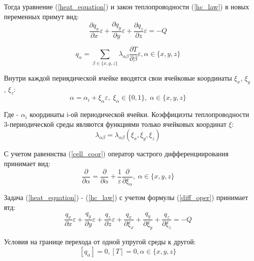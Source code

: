 Тогда уравнение 
(\ref{heat_equation}) 
и закон теплопроводности 
(\ref{hc_law}) 
в новых переменных примут вид:
\begin{equation}
    \frac{\partial q_x}{\partial x}\varepsilon + \frac{\partial q_y}{\partial y}\varepsilon + \frac{\partial q_z}{\partial z}\varepsilon = -Q
\end{equation}

\begin{equation}
    q_{\alpha} = \sum_{\beta \in \{x,y,z\}}\lambda_{\alpha\beta} \frac{\partial T}{\partial \beta}\varepsilon, \alpha \in \{x,y,z\}
\end{equation}

Внутри каждой периядической ячейке вводятся свои ячейковые координаты 
$\xi_x$, $\xi_y$, $\xi_z$:
\begin{equation}
    \label{cell_coor}
    \alpha=\alpha_i + \xi_{\alpha}\varepsilon, \; \xi_{\alpha} \in \{0,1\}, \; \alpha \in \{x,y,z\}
\end{equation}

Где - 
$\alpha_i$ 
координаты i-ой периодической ячейки. Коэффициэты теплопроводности 3-периодической среды являются функциями только ячейковых координат 
$\xi$:
\begin{equation}
    \lambda_{\alpha \beta} = \lambda_{\alpha \beta}(\xi_x, \xi_y, \xi_z)
\end{equation}

С учетом равеннства 
(\ref{cell_coor}) 
оператор частрого дифференциирования принимает вид:
\begin{equation}
    \label{diff_oper}
    \frac{\partial}{\partial \alpha}=\frac{\partial}{\partial \alpha} + \frac{1}{\varepsilon}\frac{\partial}{\partial \xi_{\alpha}}, \; \alpha \in \{x,y,z\}
\end{equation}

Задача 
(\ref{heat_equation})
-
(\ref{hc_law})
с учетом формулы 
(\ref{diff_oper})
принимает втд:
\begin{equation}
    \label{heat_equation_epsilon}
    \frac{q_x}{\partial x}\varepsilon+
    \frac{q_y}{\partial y}\varepsilon+
    \frac{q_z}{\partial z}\varepsilon+
    \frac{q_x}{\partial \xi_x}+
    \frac{q_y}{\partial \xi_y}+
    \frac{q_z}{\partial \xi_z}=
    -Q
\end{equation}

Условия на границе перехода от одной упругой среды к другой:
\begin{equation}
    \left[ q_\alpha \right] = 0, \left[ T \right] = 0, \alpha \in \{ x,y,z \}
\end{equation}

